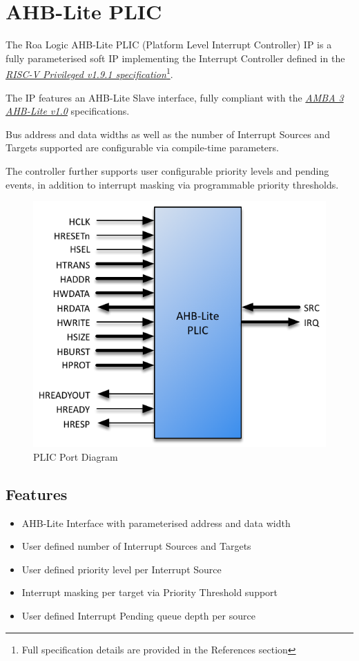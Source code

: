 \chapter{AHB-Lite PLIC}

The Roa Logic AHB-Lite PLIC (Platform Level Interrupt Controller) IP is a fully parameterised soft IP implementing the Interrupt Controller defined in the \emph{\href{https://github.com/riscv/riscv-isa-manual/blob/master/release/riscv-privileged-v1.9.1.pdf}{RISC-V Privileged v1.9.1 specification}}\footnote{Full specification details are provided in the References section}.

The IP features an AHB-Lite Slave interface, fully compliant with the \emph{\href{https://www.arm.com/products/system-ip/amba-specifications}{AMBA 3 AHB-Lite v1.0}} specifications. 

Bus address and data widths as well as the number of Interrupt Sources and Targets supported are configurable via compile-time parameters.

The controller further supports user configurable priority levels and pending events, in addition to interrupt masking via programmable priority thresholds.

\begin{figure}[!htb]
  \includegraphics{img/plic-ports.png}
  \caption{PLIC Port Diagram}
  \label{fig:PORTDIAG}
\end{figure}

\section{Features}

\begin{itemize}
\item
AHB-Lite Interface with parameterised address and data width
\item
User defined number of Interrupt Sources and Targets
\item
User defined priority level per Interrupt Source
\item
Interrupt masking per target via Priority Threshold support
\item
User defined Interrupt Pending queue depth per source
\end{itemize}
